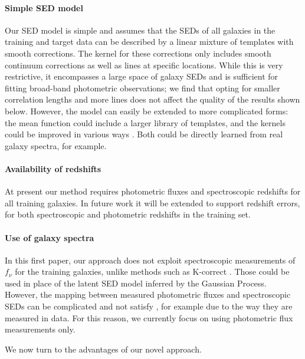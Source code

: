 \documentclass[aps,prd,showpacs,superscriptaddress,groupedaddress]{revtex4}  %
\begin{document}
\paragraph{Simple SED model}
Our SED model is simple and assumes that the SEDs of all galaxies in the training and target data can be described by a linear mixture of templates with smooth corrections.
The kernel for these corrections only includes smooth continuum corrections as well as lines at specific locations.
While this is very restrictive, it encompasses a large space of galaxy SEDs and is sufficient for fitting broad-band photometric observations; we find that opting for smaller correlation lengths and more lines does not affect the quality of the results shown below.
However, the model can easily be extended to more complicated forms: the mean function could include a larger library of templates, and the kernels could be improved in various ways \cite[see \eg][]{Miller:2015:gpqso}.
Both could be directly learned from real galaxy spectra, for example.

\paragraph{Availability of redshifts} 
At present our method requires photometric fluxes and spectroscopic redshifts for all training galaxies. 
In future work it will be extended to support redshift errors, for both spectroscopic and photometric redshifts in the training set. 

\paragraph{Use of galaxy spectra}
In this first paper, our approach does not exploit spectroscopic measurements of $f_\nu$ for the training galaxies, unlike methods such as K-correct \cite{Blanton:2007}.
Those could be used in place of the latent SED model inferred by the Gaussian Process. 
However, the mapping between measured photometric fluxes and spectroscopic SEDs can be complicated and not satisfy , for example due to the way they are measured in data.
For this reason, we currently focus on using photometric flux measurements only.

\smallskip
We now turn to the advantages of our novel approach.
\smallskip
\end{document}
